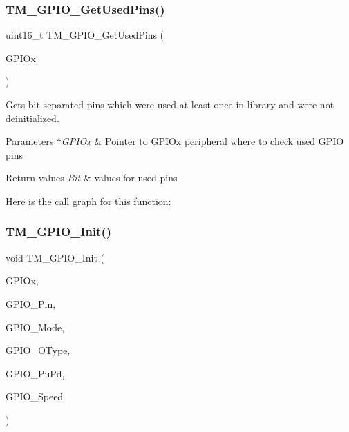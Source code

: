 \subsubsection{\texorpdfstring{T\+M\+\_\+\+G\+P\+I\+O\+\_\+\+Get\+Used\+Pins()}{TM\_GPIO\_GetUsedPins()}}
{\footnotesize\ttfamily uint16\+\_\+t T\+M\+\_\+\+G\+P\+I\+O\+\_\+\+Get\+Used\+Pins (\begin{DoxyParamCaption}\item[{G\+P\+I\+O\+\_\+\+Type\+Def $\ast$}]{G\+P\+I\+Ox }\end{DoxyParamCaption})}



Gets bit separated pins which were used at least once in library and were not deinitialized. 


\begin{DoxyParams}{Parameters}
{\em $\ast$\+G\+P\+I\+Ox} & Pointer to G\+P\+I\+Ox peripheral where to check used G\+P\+IO pins \\
\hline
\end{DoxyParams}

\begin{DoxyRetVals}{Return values}
{\em Bit} & values for used pins \\
\hline
\end{DoxyRetVals}
Here is the call graph for this function\+:
\mbox{\label{group___t_m___g_p_i_o___functions_ga7ea61719f45c8d46e56f636d7ffdf0d0}} 
\subsubsection{\texorpdfstring{T\+M\+\_\+\+G\+P\+I\+O\+\_\+\+Init()}{TM\_GPIO\_Init()}}
{\footnotesize\ttfamily void T\+M\+\_\+\+G\+P\+I\+O\+\_\+\+Init (\begin{DoxyParamCaption}\item[{G\+P\+I\+O\+\_\+\+Type\+Def $\ast$}]{G\+P\+I\+Ox,  }\item[{uint16\+\_\+t}]{G\+P\+I\+O\+\_\+\+Pin,  }\item[{\hyperlink{group___t_m___g_p_i_o___typedefs_gacbb363a57d0e70ea563e494eff1db3ca}{T\+M\+\_\+\+G\+P\+I\+O\+\_\+\+Mode\+\_\+t}}]{G\+P\+I\+O\+\_\+\+Mode,  }\item[{\hyperlink{group___t_m___g_p_i_o___typedefs_ga1d443fe266a4073f40ea271ae7b8df9f}{T\+M\+\_\+\+G\+P\+I\+O\+\_\+\+O\+Type\+\_\+t}}]{G\+P\+I\+O\+\_\+\+O\+Type,  }\item[{\hyperlink{group___t_m___g_p_i_o___typedefs_ga50ddb0da56d8a388dee368c55e968602}{T\+M\+\_\+\+G\+P\+I\+O\+\_\+\+Pu\+Pd\+\_\+t}}]{G\+P\+I\+O\+\_\+\+Pu\+Pd,  }\item[{\hyperlink{group___t_m___g_p_i_o___typedefs_gaa57736d106efbe14067be22025f296c4}{T\+M\+\_\+\+G\+P\+I\+O\+\_\+\+Speed\+\_\+t}}]{G\+P\+I\+O\+\_\+\+Speed }\end{DoxyParamCaption})}



